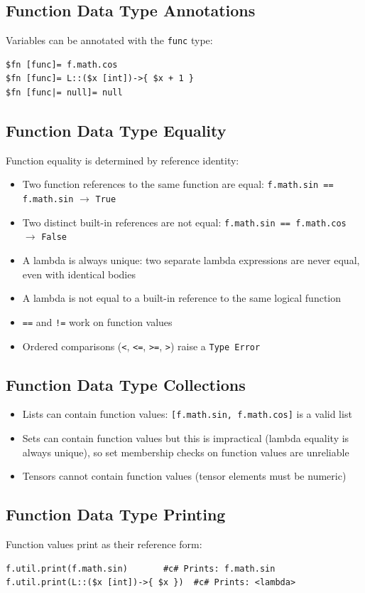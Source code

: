\subsection{Function Data Type Annotations}
Variables can be annotated with the \texttt{func} type:
\begin{verbatim}
$fn [func]= f.math.cos
$fn [func]= L::($x [int])->{ $x + 1 }
$fn [func|= null]= null
\end{verbatim}

\subsection{Function Data Type Equality}
Function equality is determined by reference identity:
\begin{itemize}
\item Two function references to the same function are equal: \texttt{f.math.sin == f.math.sin} $\rightarrow$ \texttt{True}
\item Two distinct built-in references are not equal: \texttt{f.math.sin == f.math.cos} $\rightarrow$ \texttt{False}
\item A lambda is always unique: two separate lambda expressions are never equal, even with identical bodies
\item A lambda is not equal to a built-in reference to the same logical function
\item \texttt{==} and \texttt{!=} work on function values
\item Ordered comparisons (\texttt{<}, \texttt{<=}, \texttt{>=}, \texttt{>}) raise a \texttt{Type Error}
\end{itemize}

\subsection{Function Data Type Collections}
\begin{itemize}
\item Lists can contain function values: \texttt{[f.math.sin, f.math.cos]} is a valid list
\item Sets can contain function values but this is impractical (lambda equality is always unique), so set membership checks on function values are unreliable
\item Tensors cannot contain function values (tensor elements must be numeric)
\end{itemize}

\subsection{Function Data Type Printing}
Function values print as their reference form:
\begin{verbatim}
f.util.print(f.math.sin)       #c# Prints: f.math.sin
f.util.print(L::($x [int])->{ $x })  #c# Prints: <lambda>
\end{verbatim}

